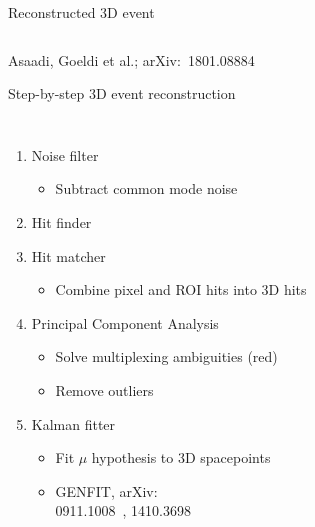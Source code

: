 \documentclass[]{beamer}
\begin{document}
\begin{frame}{Reconstructed 3D event}
\begin{columns}[c]
	\end{columns}
	\centering
	{\tiny Asaadi, Goeldi et al.; arXiv:~1801.08884~\cite{pixel_paper}}
\end{frame}

\begin{frame}{Step-by-step 3D event reconstruction}
	\begin{columns}[c]
		\begin{enumerate}
			\item<1-> Noise filter
			\begin{itemize}
				\item Subtract common mode noise
			\end{itemize}
			\item<2-> Hit finder
			\item<2-> Hit matcher
			\begin{itemize}
				\item Combine pixel and ROI hits into 3D hits
			\end{itemize}
			\item<3-> Principal Component Analysis
			\begin{itemize}
				\item Solve multiplexing ambiguities (red)
				\item Remove outliers
			\end{itemize}
			\item<4-> Kalman fitter
			\begin{itemize}
				\item Fit $\mu$ hypothesis to 3D spacepoints
				\item GENFIT, arXiv:\\0911.1008~\cite{genfit1}, 1410.3698~\cite{genfit2}
			\end{itemize}
		\end{enumerate}
		\centering

\end{columns}
\end{frame}
\end{document}
